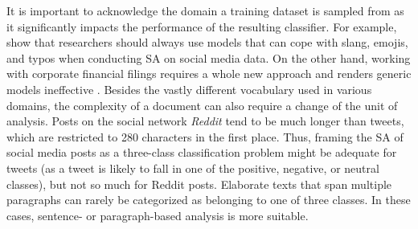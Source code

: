  It is important to acknowledge the domain a training dataset is sampled from as it significantly impacts the performance of the resulting classifier. For example,  show that researchers should always use models that can cope with slang, emojis, and typos when conducting SA on social media data. On the other hand, working with corporate financial filings requires a whole new approach and renders generic models ineffective . Besides the vastly different vocabulary used in various domains, the complexity of a document can also require a change of the unit of analysis. Posts on the social network \emph{Reddit} tend to be much longer than tweets, which are restricted to 280 characters in the first place. Thus, framing the SA of social media posts as a three-class classification problem might be adequate for tweets (as a tweet is likely to fall in one of the positive, negative, or neutral classes), but not so much for Reddit posts. Elaborate texts that span multiple paragraphs can rarely be categorized as belonging to one of three classes. In these cases, sentence- or paragraph-based analysis is more suitable.
 




